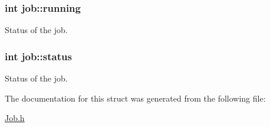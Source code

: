\hypertarget{structjob_a88d7e67d62586ecfcccca13251f62f98}{
\subsubsection[{running}]{\setlength{\rightskip}{0pt plus 5cm}int {\bf job::running}}}
\label{structjob_a88d7e67d62586ecfcccca13251f62f98}


Status of the job. 

\hypertarget{structjob_a610b66cc483fbb6c2ba016d1dc62c9a0}{
\subsubsection[{status}]{\setlength{\rightskip}{0pt plus 5cm}int {\bf job::status}}}
\label{structjob_a610b66cc483fbb6c2ba016d1dc62c9a0}


Status of the job. 



The documentation for this struct was generated from the following file:\begin{DoxyCompactItemize}
\item 
\hyperlink{Job_8h}{Job.h}\end{DoxyCompactItemize}
